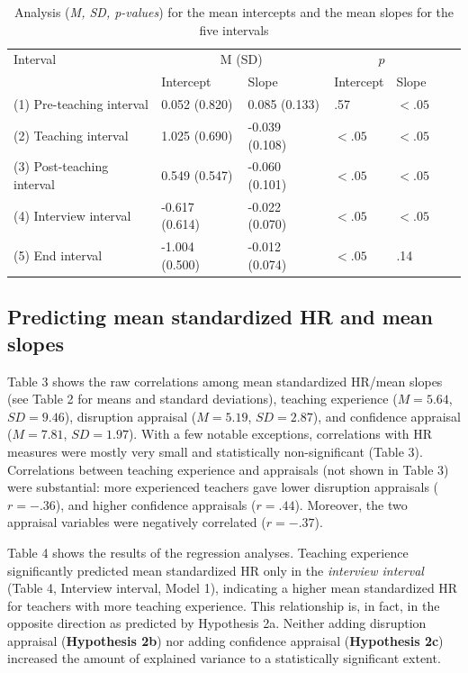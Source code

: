 \documentclass[preprint, 3p,
authoryear]{elsarticle} %
\begin{document}
\renewcommand{\arraystretch}{1.5} 

\begin{table}[ht]
    \centering
    \begin{tabularx}{\textwidth}{lXXXXXX}
        \toprule
        Interval  & \multicolumn{2}{c}{M (SD)} & \multicolumn{2}{c}{$p$} \\ & Intercept & Slope & Intercept & Slope \\
        \midrule
        (1) Pre-teaching interval & 0.052 (0.820) & 0.085 (0.133) & .57 & $< .05$ \\
        (2) Teaching interval & 1.025 (0.690) & -0.039 (0.108) & $< .05$ & $< .05$ \\
        (3) Post-teaching interval & 0.549 (0.547) & -0.060 (0.101) & $< .05$ & $< .05$ \\
        (4) Interview interval & -0.617 (0.614) & -0.022 (0.070) & $< .05$ & $< .05$ \\
        (5) End interval & -1.004 (0.500) & -0.012 (0.074) & $< .05$ & .14 \\
        \bottomrule
    \end{tabularx}
    \caption{Analysis (\textit{M, SD, p-values}) for the mean intercepts and the mean slopes for the five intervals }
    \label{tab_2}
\end{table}

\subsection{Predicting mean standardized HR and mean
slopes}\label{predicting-mean-standardized-hr-and-mean-slopes}

Table 3 shows the raw correlations among mean standardized HR/mean
slopes (see Table 2 for means and standard deviations), teaching
experience (\(M = 5.64\), \(SD = 9.46\)), disruption appraisal
(\(M = 5.19\), \(SD = 2.87\)), and confidence appraisal (\(M = 7.81\),
\(SD = 1.97\)). With a few notable exceptions, correlations with HR
measures were mostly very small and statistically non-significant (Table
3). Correlations between teaching experience and appraisals (not shown
in Table 3) were substantial: more experienced teachers gave lower
disruption appraisals (\(r = -.36\)), and higher confidence appraisals
(\(r = .44\)). Moreover, the two appraisal variables were negatively
correlated (\(r = -.37\)).

Table 4 shows the results of the regression analyses. Teaching
experience significantly predicted mean standardized HR only in the
\emph{interview interval} (Table 4, Interview interval, Model 1),
indicating a higher mean standardized HR for teachers with more teaching
experience. This relationship is, in fact, in the opposite direction as
predicted by Hypothesis 2a. Neither adding disruption appraisal
(\textbf{Hypothesis 2b}) nor adding confidence appraisal
(\textbf{Hypothesis 2c}) increased the amount of explained variance to a
statistically significant extent.
\end{document}
